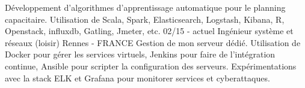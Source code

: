 \documentclass[]{friggeri-cv}
\begin{document}
\begin{entrylist}
{    %
    Développement d’algorithmes d’apprentissage automatique pour le planning capacitaire.
    Utilisation de Scala, Spark, Elasticsearch, Logstash, Kibana, R, Openstack, influxdb, Gatling, Jmeter, etc.    
}
  \entry
    {02/15 - actuel}
    {Ingénieur système et réseaux (loisir)}
    {Rennes - FRANCE}
    {Gestion de mon serveur dédié.
    Utilisation de Docker pour gérer les services virtuels, Jenkins pour faire de l'intégration continue, Ansible pour scripter la configuration des serveurs. Expérimentations avec la stack ELK et Grafana pour monitorer services et cyberattaques.    
   }
\end{entrylist}

\vspace{-1.1em}

\end{document}
